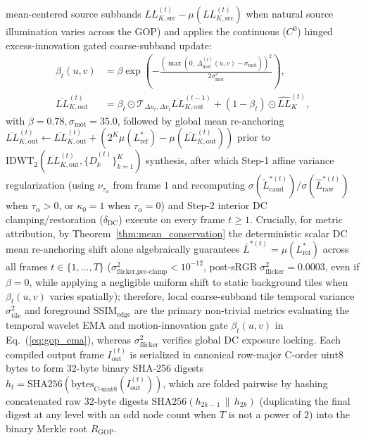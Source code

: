 \documentclass[conference,10pt]{IEEEtran}
\begin{document}
mean-centered source subbands $LL_{K,\text{src}}^{(t)} - \mu(LL_{K,\text{src}}^{(t)})$ when natural source illumination varies across the GOP) and applies the continuous ($C^0$) hinged excess-innovation gated coarse-subband update:
\begin{equation}
\label{eq:gop_ema}
\begin{aligned}
\beta_t(u,v) &= \beta \exp\!\left(-\frac{\left(\max(0,\, \Delta_{\text{mot}}^{(t)}(u,v) - \sigma_{\text{mot}})\right)^2}{2\sigma_{\text{mot}}^2}\right), \\
\overline{LL}_{K,\text{out}}^{(t)} &= \beta_t \odot \mathcal{T}_{\Delta u_t, \Delta v_t}\overline{LL}_{K,\text{out}}^{(t-1)} + (1 - \beta_t) \odot \widehat{LL}_K^{(t)},
\end{aligned}
\end{equation}
with $\beta = 0.78, \sigma_{\text{mot}} = 35.0$, followed by global mean re-anchoring $\overline{LL}_{K,\text{out}}^{(t)} \leftarrow \overline{LL}_{K,\text{out}}^{(t)} + (2^K \mu(L^*_{\text{ref}}) - \mu(\overline{LL}_{K,\text{out}}^{(t)}))$ prior to $\mathrm{IDWT}_2(\overline{LL}_{K,\text{out}}^{(t)}, \{\widehat{D}_k^{(t)}\}_{k=1}^K)$ synthesis, after which Step-1 affine variance regularization (using $\nu_{\tau_\alpha}$ from frame $1$ and recomputing $\sigma(\widetilde{L}^{*(t)}_{\text{cand}})/\sigma(\widehat{L}^{*(t)}_{\text{raw}})$ when $\tau_\alpha > 0$, or $\kappa_0 = 1$ when $\tau_\alpha = 0$) and Step-2 interior DC clamping/restoration ($\delta_{\text{DC}}$) execute on every frame $t \ge 1$. Crucially, for metric attribution, by Theorem~\ref{thm:mean_conservation} the deterministic scalar DC mean re-anchoring shift alone algebraically guarantees $\overline{L}^{*(t)} = \mu(L^*_{\text{ref}})$ across all frames $t \in \{1, \dots, T\}$ ($\sigma^2_{\text{flicker,pre-clamp}} < 10^{-12}$, post-sRGB $\sigma^2_{\text{flicker}} = 0.0003$, even if $\beta = 0$, while applying a negligible uniform shift to static background tiles when $\beta_t(u,v)$ varies spatially); therefore, local coarse-subband tile temporal variance $\sigma^2_{\text{tile}}$ and foreground $\mathrm{SSIM}_{\text{edge}}$ are the primary non-trivial metrics evaluating the temporal wavelet EMA and motion-innovation gate $\beta_t(u,v)$ in Eq.~(\ref{eq:gop_ema}), whereas $\sigma^2_{\text{flicker}}$ verifies global DC exposure locking. Each compiled output frame $I_{\text{out}}^{(t)}$ is serialized in canonical row-major C-order $\mathrm{uint8}$ bytes to form 32-byte binary SHA-256 digests $h_t = \mathrm{SHA256}(\mathrm{bytes}_{\text{C-uint8}}(I_{\text{out}}^{(t)}))$, which are folded pairwise by hashing concatenated raw 32-byte digests $\mathrm{SHA256}(h_{2k-1} \,\|\, h_{2k})$ (duplicating the final digest at any level with an odd node count when $T$ is not a power of $2$) into the binary Merkle root $R_{\text{GOP}}$.
\end{document}
